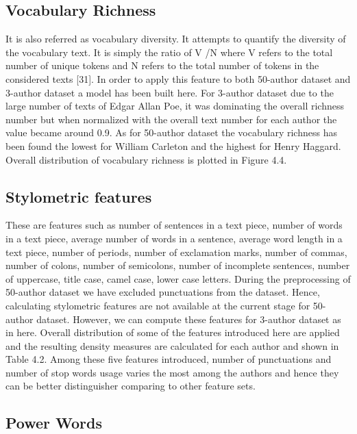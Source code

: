 \subsection{Vocabulary Richness}
It is also referred as vocabulary diversity. It attempts to quantify the diversity of the vocabulary text. It is simply the ratio of V /N where V refers to the total number of unique tokens and N refers to the total number of tokens in the considered texts [31]. In order to apply this feature to both 50-author dataset and 3-author dataset a model has been built here. For 3-author dataset due to the large number of texts of Edgar Allan Poe, it was dominating the overall richness number but when normalized with the overall text number for each author the value became around 0.9. As for 50-author dataset the vocabulary richness has been found the lowest for William Carleton and the highest for Henry Haggard. Overall distribution of
vocabulary richness is plotted in Figure 4.4.

\subsection{Stylometric features}

These are features such as number of sentences in a text piece, number of words in a text piece, average number of words in a sentence, average word length in a text piece, number of periods, number of exclamation marks, number of commas, number of colons, number of semicolons, number of incomplete sentences, number of uppercase, title case, camel case, lower case letters. During the preprocessing of 50-author dataset
we have excluded punctuations from the dataset. Hence, calculating stylometric features are not available at the current stage for 50-author dataset. However, we can compute these features for 3-author dataset as in here. Overall distribution of some of the features introduced here are applied and the resulting density measures are calculated for each author and shown in Table 4.2. Among these five features introduced, number of punctuations and number of stop words usage varies the most among the authors and hence they can be better distinguisher comparing to other feature sets.

\subsection{Power Words}

